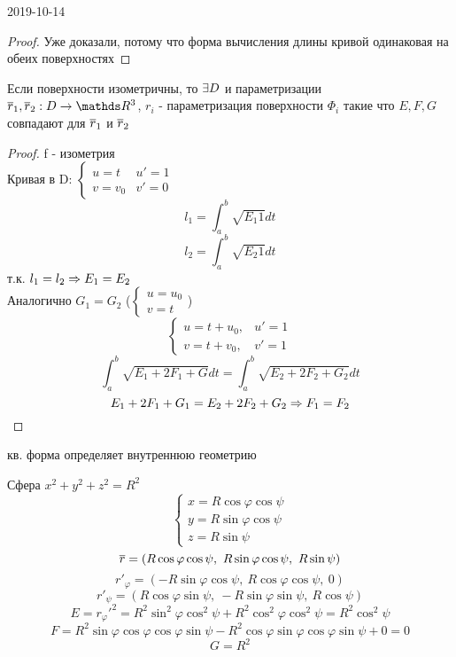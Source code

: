 \documentclass[main, 12pt, fleqn]{subfiles}
\begin{document}
\begin{lect} {2019-10-14}
  \begin{proof}
    Уже доказали, потому что форма вычисления длины кривой одинаковая на обеих поверхностях
  \end{proof}

  \begin{remark}
    Если поверхности изометричны, то $\exists D$ и параметризации $\ol{r}_1, \ol{r}_2: D \ra \R^3$, $r_i$ - параметризация поверхности $\Phi_i$ такие что $E,F,G$ совпадают для $\overline{r}_1$ и $\overline{r}_2$
  \end{remark}

  \begin{proof}
    f - изометрия\\
    Кривая в D: $\begin{cases}
      u = t & u'=1\\
      v=v_0  & v'=0
    \end{cases}$
    \[l_1 = \int_a^b \sqrt{E_1 1} dt\]
    \[l_2 = \int_a^b \sqrt{E_2 1} dt\]
    т.к. $l_1 = l_2 \Rightarrow E_1 = E_2$\\
    Аналогично $G_1 = G_2$ ($\begin{cases}
      u=u_0\\
      v=t
    \end{cases}$)
    \[\begin{cases}
      u = t + u_0, & u' = 1\\
      v = t + v_0, & v' = 1
    \end{cases}\]
    \[\int_a^b \sqrt{E_1 + 2 F_1 + G} dt = \int_a^b \sqrt{E_2 + 2F_2 + G_2} dt\]
    \[E_1 + 2F_1 + G_1 = E_2+ 2 F_2 + G_2 \Rightarrow F_1 = F_2\]
  \end{proof}

  \begin{consequence}
     кв. форма определяет внутреннюю геометрию
  \end{consequence}


  \begin{example}
    Сфера $x^2 + y^2 + z^2 = R^2$
    \[\begin{cases}
      x = R \cos\varphi \cos\psi\\
      y = R \sin\varphi \cos\psi\\
      z = R \sin\psi
    \end{cases}\]
    \[\overline{r} = (R \cos\varphi \cos\psi,\ R\sin\varphi \cos\psi,\ R \sin\psi)\]
    \[r'_{\varphi} = (-R \sin\varphi \cos\psi,\ R\cos\varphi \cos\psi,\ 0)\]
    \[r'_{\psi} = (R \cos\varphi \sin\psi,\ -R\sin\varphi \sin\psi,\ R \cos\psi)\]
    \[E = r_{\varphi}'^2 = R^2 \sin^2 \varphi \cos^2 \psi + R^2 \cos^2 \varphi \cos^2 \psi = R^2 \cos^2 \psi\]
    \[F = R^2 \sin\varphi \cos\varphi\cos\varphi\sin\psi - R^2 \cos\varphi \sin\varphi \cos\varphi \sin\psi + 0 = 0\]
    \[G = R^2\]
  \end{example}


\end{lect}
\end{document}
